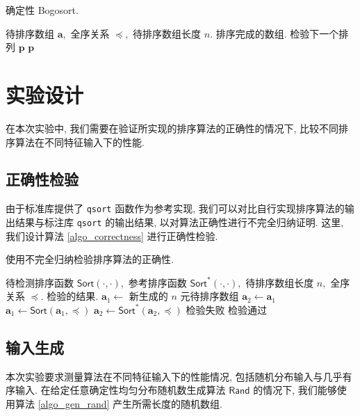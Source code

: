 \documentclass[12pt]{article}
\begin{document}
\begin{algorithm}
\caption{确定性 Bogosort.}
\label{algo_bogosort_determ}
\begin{algorithmic}[1]
\Require 待排序数组 $\bm{a},$ 全序关系 $\preceq,$ 待排序数组长度 $n.$
\Ensure 排序完成的数组.
            \State 检验下一个排列 $\bm{p}$
        \EndIf
    \EndFor
    \State \Return $\bm{p}$
\EndFor
\end{algorithmic}
\end{algorithm}

\section{实验设计}

在本次实验中, 我们需要在验证所实现的排序算法的正确性的情况下, 比较不同排序算法在不同特征输入下的性能.

\subsection{正确性检验}

由于标准库提供了 \texttt{qsort} 函数作为参考实现, 我们可以对比自行实现排序算法的输出结果与标注库 \texttt{qsort} 的输出结果, 以对算法正确性进行不完全归纳证明. 这里, 我们设计算法 \ref{algo_correctness} 进行正确性检验.

\begin{algorithm}
\caption{使用不完全归纳检验排序算法的正确性.}
\label{algo_correctness}
\begin{algorithmic}[1]
\Require 待检测排序函数 $\mathsf{Sort}(\cdot, \cdot),$ 参考排序函数 $\mathsf{Sort}^*(\cdot, \cdot),$ 待排序数组长度 $n,$ 全序关系 $\preceq.$
\Ensure 检验的结果.
\State $\bm{a}_1 \gets$ 新生成的 $n$ 元待排序数组
\State $\bm{a}_2 \gets \bm{a}_1$
\State $\bm{a}_1 \gets \mathsf{Sort}(\bm{a}_1, \preceq)$
\State $\bm{a}_2 \gets \mathsf{Sort}^*(\bm{a}_2, \preceq)$
       \State \Return 检验失败
    \EndIf
\EndFor
\State \Return 检验通过
\end{algorithmic}
\end{algorithm}

\subsection{输入生成}

本次实验要求测量算法在不同特征输入下的性能情况, 包括随机分布输入与几乎有序输入. 在给定任意确定性均匀分布随机数生成算法 $\mathsf{Rand}$ 的情况下, 我们能够使用算法 \ref{algo_gen_rand} 产生所需长度的随机数组.
\end{document}

